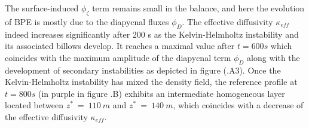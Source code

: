 The surface-induced $\phi_{\zeta}$ term remains small in the balance, and here the evolution of BPE is mostly due to the diapycnal fluxes $\phi_D$. The effective diffusivity $\kappa_{eff}$ indeed increases significantly after 200 s as the Kelvin-Helmholtz instability and its associated billows develop. It reaches a maximal value after $t=600 s$ which coincides with the maximum amplitude of the diapycnal term $\phi_D$ along with the development of secondary instabilities as depicted in figure (.A3).
Once the Kelvin-Helmholtz instability has mixed the density field, the reference profile at $t=800s$ (in purple in figure .B) exhibits an intermediate homogeneous layer located between $z^*\ =\ 110\ m$ and $z^*\ =\ 140\ m$, which coincides with a decrease of the effective diffusivity $\kappa_{eff}$.

